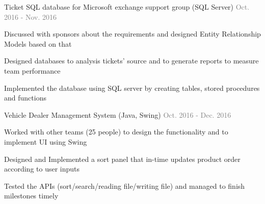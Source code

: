 \begin{cventries}

  \cventry
    {}
    {Ticket SQL database for Microsoft exchange support group  (SQL Server)} %
    {
      \textcolor{graytext}{Oct. 2016 - Nov. 2016} %
    }
    {}
    {}

  \vspace{-15mm}
  \cventry
    {}
    {}
    {}
    {}
    {
      \begin{cvitems} %
        \item {Discussed with sponsors about the requirements and designed Entity Relationship Models based on that}
        \item {Designed databases to analysis tickets’ source and to generate reports to measure team performance}
        \item {Implemented the database using SQL server by creating tables, stored procedures and functions}
      \end{cvitems}
    }


  \cventry
    {}
    {Vehicle Dealer Management System (Java, Swing)} %
    {
      \textcolor{graytext}{Oct. 2016 - Dec. 2016} %
    }
    {}
    {}

  \vspace{-15mm}
  \cventry
    {}
    {}
    {}
    {}
    {
      \begin{cvitems} %
        \item {Worked with other teams (25 people) to design the functionality and to implement UI using Swing}
        \item {Designed and Implemented a sort panel that in-time updates product order according to user inputs}
        \item {Tested the APIs (sort/search/reading file/writing file) and managed to finish milestones timely}
      \end{cvitems}
    }
  \vspace{-2mm}


\end{cventries}

